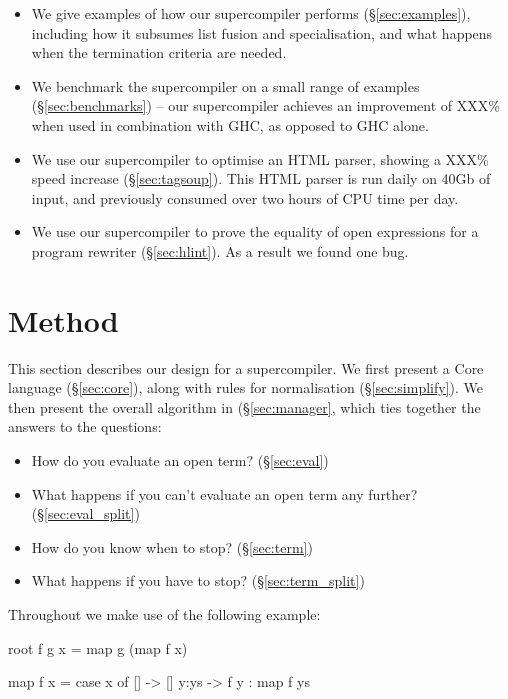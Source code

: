\documentclass{sigplanconf}
\newcommand{\unknown}{XXX}
\begin{document}
\begin{itemize}
\item We give examples of how our supercompiler performs (\S\ref{sec:examples}), including how it subsumes list fusion and specialisation, and what happens when the termination criteria are needed.
\item We benchmark the supercompiler on a small range of examples (\S\ref{sec:benchmarks}) -- our supercompiler achieves an improvement of \unknown{}\% when used in combination with GHC, as opposed to GHC alone.
\item We use our supercompiler to optimise an HTML parser, showing a \unknown{}\% speed increase (\S\ref{sec:tagsoup}). This HTML parser is run daily on 40Gb of input, and previously consumed over two hours of CPU time per day.
\item We use our supercompiler to prove the equality of open expressions for a program rewriter (\S\ref{sec:hlint}). As a result we found one bug.
\end{itemize}

\section{Method}
\label{sec:method}

This section describes our design for a supercompiler. We first present a Core language (\S\ref{sec:core}), along with rules for normalisation (\S\ref{sec:simplify}). We then present the overall algorithm in (\S\ref{sec:manager}, which ties together the answers to the questions:

\begin{itemize}
\item How do you evaluate an open term? (\S\ref{sec:eval})
\item What happens if you can't evaluate an open term any further? (\S\ref{sec:eval_split})
\item How do you know when to stop? (\S\ref{sec:term})
\item What happens if you have to stop? (\S\ref{sec:term_split})
\end{itemize}

Throughout we make use of the following example:

\begin{code}
root f g x = map g (map f x)

map f x = case x of
    []    -> []
    y:ys  -> f y : map f ys
\end{code}
\end{document}
